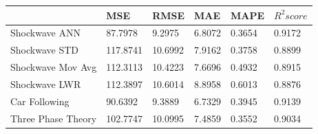\documentclass[11pt]{report}
\begin{document}
\begin{table}[H]
	\begin{center}
	\vspace{0.5cm}
	\begin{tabular}{@{}llllll@{}}
		\toprule
										   & MSE                                                  & RMSE                                                & MAE                                                 & MAPE                                                & $R^2score$                                          \\ \midrule
		\multicolumn{1}{l|}{Shockwave ANN} & \multicolumn{1}{l|}{\cellcolor[HTML]{C0C0C0}87.7978} & \multicolumn{1}{l|}{\cellcolor[HTML]{C0C0C0}9.2975} & 6.8072                                              & \multicolumn{1}{l|}{0.3654}                         & \multicolumn{1}{l|}{\cellcolor[HTML]{C0C0C0}0.9172} \\
		Shockwave STD                      & 117.8741                                             & 10.6992                                             & 7.9162                                              & 0.3758                                              & 0.8899                                              \\
		Shockwave Mov Avg                  & 112.3113                                             & 10.4223                                             & 7.6696                                              & 0.4932                                              & 0.8915                                              \\
		Shockwave LWR                      & 112.3897                                             & 10.6014                                             & 8.8958                                              & 0.6013                                              & 0.8876                                              \\
		Car Following                      & 90.6392                                              & \multicolumn{1}{l|}{9.3889}                         & \multicolumn{1}{l|}{\cellcolor[HTML]{C0C0C0}6.7329} & 0.3945                                              & 0.9139                                              \\
		Three Phase Theory                 & 102.7747                                             & 10.0995                                             & \multicolumn{1}{l|}{7.4859}                         & \multicolumn{1}{l|}{\cellcolor[HTML]{C0C0C0}0.3552} & 0.9034                                              \\

\end{tabular}
\end{center}
\end{table}
\end{document}
